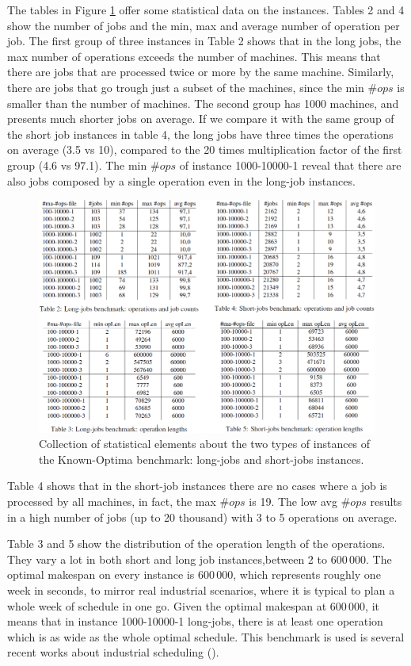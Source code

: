 \documentclass{article}
\begin{document}
The tables in Figure \ref{fig:bench} offer some statistical data on the instances. Tables 2 and 4 show the number of jobs and the min, max and average number of operation per job. The first group of three instances in Table 2 shows that in the long jobs, the max number of operations exceeds the number of machines. This means that there are jobs that are processed twice or more by the same machine. Similarly, there are jobs that go trough just a subset of the machines, since the min $\#ops$ is smaller than the number of machines. The second group has 1000 machines, and presents much shorter jobs on average. If we compare it with the same group of the short job instances in table 4, the long jobs have three times the operations on average (3.5 vs 10), compared to the 20 times multiplication factor of the first group (4.6 vs 97.1). The min $\#ops$ of instance 1000-10000-1 reveal that there are also jobs composed by a single operation even in the long-job instances.
\begin{figure}[ht]
	\centering
		\includegraphics[width=1.1\textwidth]{bench_stats.PNG}
	\caption{Collection of statistical elements about the two types of instances of the Known-Optima benchmark: long-jobs and short-jobs instances.}
	\label{fig:bench}
\end{figure}
Table 4 shows that in the short-job instances there are no cases where a job is processed by all machines, in fact, the max $\#ops$ is 19. The low avg $\#ops$ results in a high number of jobs (up to 20 thousand) with 3 to 5 operations on average. 

Table 3 and 5 show the distribution of the operation length of the operations. They vary a lot in both short and long job instances,between 2 to $600\, 000$. The optimal makespan on every instance is $600\, 000$, which represents roughly one week in seconds, to mirror real industrial scenarios, where it is typical to plan a whole week of schedule in one go. Given the optimal makespan at $600\, 000$, it means that in instance 1000-10000-1 long-jobs, there is at least one operation which is as wide as the whole optimal schedule. This benchmark is used is several recent works about industrial scheduling (\cite{teppan2018dispatching,dacol2019iclp,Teppan2020}).
\end{document}
